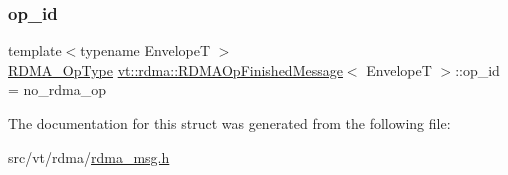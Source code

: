 \subsubsection{\texorpdfstring{op\+\_\+id}{op\_id}}
{\footnotesize\ttfamily template$<$typename EnvelopeT $>$ \\
\hyperlink{namespacevt_1_1rdma_a9b966d9780a2b41afe7cd7b7b4b20300}{R\+D\+M\+A\+\_\+\+Op\+Type} \hyperlink{structvt_1_1rdma_1_1_r_d_m_a_op_finished_message}{vt\+::rdma\+::\+R\+D\+M\+A\+Op\+Finished\+Message}$<$ EnvelopeT $>$\+::op\+\_\+id = no\+\_\+rdma\+\_\+op}



The documentation for this struct was generated from the following file\+:\begin{DoxyCompactItemize}
\item 
src/vt/rdma/\hyperlink{rdma__msg_8h}{rdma\+\_\+msg.\+h}\end{DoxyCompactItemize}
